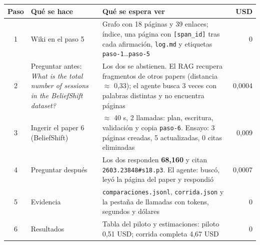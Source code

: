 \documentclass[11pt,a4paper]{article}
\newcommand{\cod}[1]{\texttt{\small #1}}
\begin{document}
\renewcommand{\arraystretch}{1.25}
\begin{center}
\begin{tabularx}{\linewidth}{@{}c >{\raggedright}p{3.2cm} X r@{}}
\toprule
\textbf{Paso} & \textbf{Qué se hace} & \textbf{Qué se espera ver} & \textbf{USD} \\
\midrule
1 & Wiki en el paso 5 & Grafo con 18 páginas y 39 enlaces; índice, una página con \cod{[span\_id]} tras cada
    afirmación, \cod{log.md} y etiquetas \cod{paso-1}…\cod{paso-5} & 0 \\
2 & Preguntar antes: \emph{What is the total number of sessions in the BeliefShift dataset?} &
    Los dos se abstienen. El RAG recupera fragmentos de otros papers (distancia $\approx$ 0,33);
    el agente busca 3 veces con palabras distintas y no encuentra páginas & 0,0004 \\
3 & Ingerir el paper 6 (BeliefShift) & $\approx$ 40 s, 2 llamadas: plan, escritura, validación
    y copia \cod{paso-6}. Ensayo: 3 páginas creadas, 5 actualizadas, 0 citas eliminadas & 0,009 \\
4 & Preguntar después & Los dos responden \textbf{68,160} y citan
    \cod{2603.23848\#s18.p3}. El agente: buscó, leyó la página del paper y respondió & 0,0007 \\
5 & Evidencia & \cod{comparaciones.jsonl}, \cod{corrida.json} y la pestaña de llamadas con
    tokens, segundos y dólares & 0 \\
6 & Resultados & Tabla del piloto y estimaciones: piloto 0,51 USD; corrida completa
    4,67 USD & 0 \\
\bottomrule
\end{tabularx}
\end{center}
\end{document}
